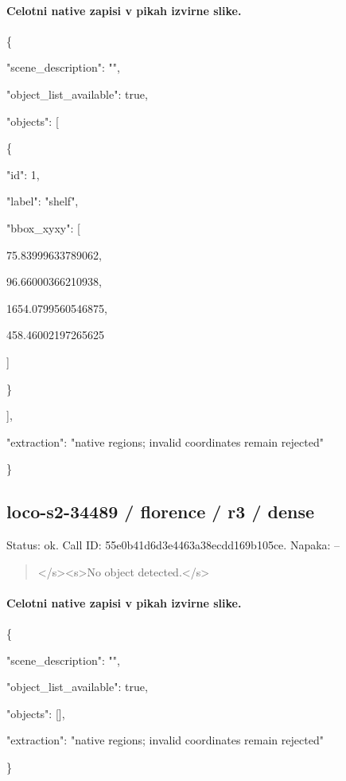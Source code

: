 \documentclass[10pt,a4paper]{article}
\begin{document}
\paragraph{Celotni native zapisi v pikah izvirne slike.}
\{\par
  "scene\_description":\allowbreak{} "",\allowbreak{}\par
  "object\_list\_available":\allowbreak{} true,\allowbreak{}\par
  "objects":\allowbreak{} [\par
    \{\par
      "id":\allowbreak{} 1,\allowbreak{}\par
      "label":\allowbreak{} "shelf",\allowbreak{}\par
      "bbox\_xyxy":\allowbreak{} [\par
        75.83999633789062,\allowbreak{}\par
        96.66000366210938,\allowbreak{}\par
        1654.0799560546875,\allowbreak{}\par
        458.46002197265625\par
      ]\par
    \}\par
  ],\allowbreak{}\par
  "extraction":\allowbreak{} "native regions; invalid coordinates remain rejected"\par
\}
\subsection*{loco-s2-34489 / florence / r3 / dense}
Status: ok. Call ID: 55e0b41d6d3e4463a38ecdd169b105ce. Napaka: --
\begin{quote}\footnotesize
</s>\allowbreak{}<s>\allowbreak{}No object detected.</s>\allowbreak{}
\end{quote}
\paragraph{Celotni native zapisi v pikah izvirne slike.}
\{\par
  "scene\_description":\allowbreak{} "",\allowbreak{}\par
  "object\_list\_available":\allowbreak{} true,\allowbreak{}\par
  "objects":\allowbreak{} [],\allowbreak{}\par
  "extraction":\allowbreak{} "native regions; invalid coordinates remain rejected"\par
\}
\end{document}
